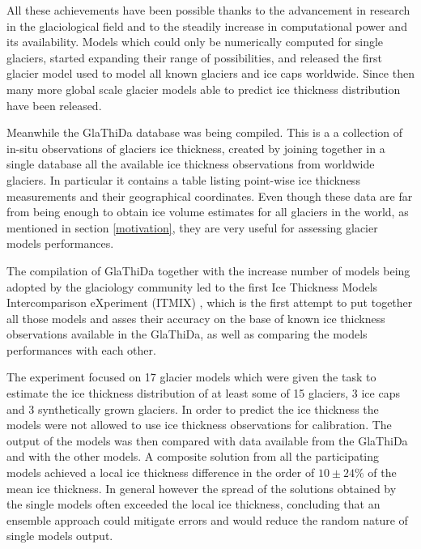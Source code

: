 All these achievements have been possible thanks to the advancement in research in the glaciological field and to the steadily increase in computational power and its availability. Models which could only be numerically computed for single glaciers, started expanding their range of possibilities, and \citet{Huss2012} released the first glacier model used to model all known glaciers and ice caps worldwide. Since then many more global scale glacier models able to predict ice thickness distribution have been released. 

Meanwhile the GlaThiDa database was being compiled. This is a a collection of in-situ observations of glaciers ice thickness, created by joining together in a single database all the available ice thickness observations from worldwide glaciers. In particular it contains a table listing point-wise ice thickness measurements and their geographical coordinates. Even though these data are far from being enough to obtain ice volume estimates for all glaciers in the world, as mentioned in section \ref{motivation}, they are very useful for assessing glacier models performances. 

The compilation of GlaThiDa together with the increase number of models being adopted by the glaciology community led to the first Ice Thickness Models Intercomparison eXperiment (ITMIX) \citep{Farinotti2017}, which is the first attempt to put together all those models and asses their accuracy on the base of known ice thickness observations available in the GlaThiDa, as well as comparing the models performances with each other. 

The experiment focused on 17 glacier models which were given the task to estimate the ice thickness distribution of at least some of 15 glaciers, 3 ice caps and 3 synthetically grown glaciers. In order to predict the ice thickness the models were not allowed to use ice thickness observations for calibration. The output of the models was then compared with data available from the GlaThiDa and with the other models. A composite solution from all the participating models achieved a local ice thickness difference in the order of $10 \pm 24\%$ of the mean ice thickness. In general however the spread of the solutions obtained by the single models often exceeded the local ice thickness, concluding that an ensemble approach could mitigate errors and would reduce the random nature of single models output.  

